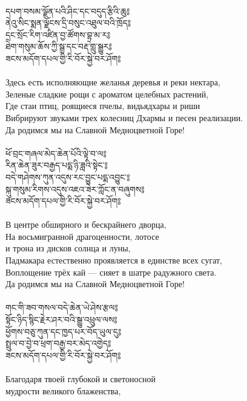 \\
{\ti དཔག་བསམ་ལྗོན་པའི་ཤིང་དང་བདུད་རྩིའི་ཆུ༔\\
ནེའུ་སིང་སྨན་ལྗོངས་དྲི་བསུང་འཐུལ་བའི་ཁྲོད༔\\
དྲང་སྲོང་རིག་འཛིན་བྱ་ཚོགས་བྷྲ་མ་ར༔\\
ཐེག་གསུམ་ཆོས་ཀྱི་སྒྲ་དང་བརྡ་གླུ་སྒྱུར༔\\
ཟངས་མདོག་དཔལ་གྱི་རི་བོར་སྐྱེ་བར་ཤོག༔}\\
\\
Здесь есть исполняющие желанья деревья и реки нектара,\\
Зеленые сладкие рощи с ароматом целебных растений,\\
Где стаи птиц, роящиеся пчелы, видьядхары и риши\\
Вибрируют звуками трех колесниц Дхармы и песен реализации.\\
Да родимся мы на Славной Медноцветной Горе!\\
\\
\newpage
{\ti ཕོ་བྲང་གཞལ་མེད་ཆེན་པོའི་ལྟེ་བ་ལ༔\\
རིན་ཆེན་ཟུར་བརྒྱད་པདྨ་ཉི་ཟླའི་སྟེང་༔\\
བདེ་གཤེགས་ཀུན་འདུས་རང་བྱུང་པདྨ་འབྱུང་༔\\
སྐུ་གསུམ་རིགས་འདུས་འཇའ་ཟེར་ཀློང་ན་བཞུགས༔\\
ཟངས་མདོག་དཔལ་གྱི་རི་བོར་སྐྱེ་བར་ཤོག༔}\\
\\
В центре обширного и бескрайнего дворца,\\
На восьмигранной драгоценности, лотосе \\ \indent и трона из дисков солнца и луны,\\
Падмакара естественно проявляется в единстве всех сугат,\\
Воплощение трёх кай — сияет в шатре радужного света.\\
Да родимся мы на Славной Медноцветной Горе!\\
\\
{\ti གང་གི་ཟབ་གསལ་བདེ་ཆེན་ཡེ་ཤེས་རྩལ༔\\
སྟོང་ཉིད་སྙིང་རྗེར་ཤར་བའི་སྒྱུ་འཕྲུལ་ལས༔\\
ཕྱོགས་བཅུ་ཀུན་དང་ཁྱད་པར་བོད་ཡུལ་དུ༔\\
སྤྲུལ་བ་བྱེ་བ་ཕྲག་བརྒྱ་བར་མེད་འགྱེད༔\\
ཟངས་མདོག་དཔལ་གྱི་རི་བོར་སྐྱེ་བར་ཤོག༔}\\
\\
\ru
Благодаря твоей глубокой и светоносной \\ \indent мудрости великого блаженства,\\
